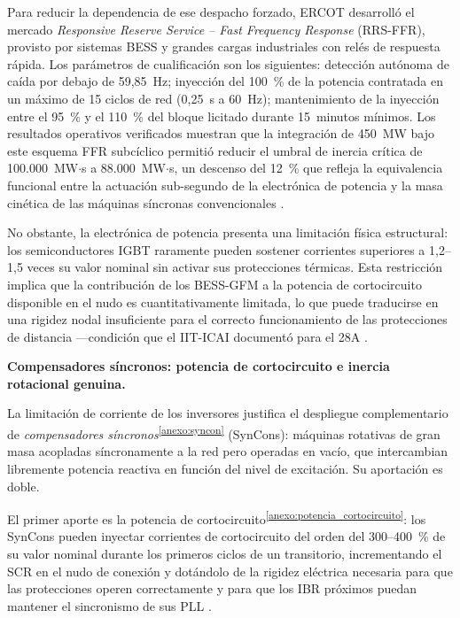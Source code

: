 Para reducir la dependencia de ese despacho forzado, ERCOT desarrolló
el mercado \textit{Responsive Reserve Service -- Fast Frequency Response}
(RRS-FFR), provisto por sistemas BESS y grandes cargas industriales con
relés de respuesta rápida. Los parámetros de cualificación son los
siguientes: detección autónoma de caída por debajo de 59{,}85~Hz;
inyección del 100~\% de la potencia contratada en un máximo de 15 ciclos
de red (0{,}25~s a 60~Hz); mantenimiento de la inyección entre el 95~\%
y el 110~\% del bloque licitado durante 15~minutos mínimos. Los
resultados operativos verificados muestran que la integración de
450~MW bajo este esquema FFR subcíclico permitió reducir el umbral de
inercia crítica de 100.000~MW$\cdot$s a 88.000~MW$\cdot$s, un descenso
del 12~\% que refleja la equivalencia funcional entre la actuación
sub-segundo de la electrónica de potencia y la masa cinética de las
máquinas síncronas convencionales \cite{futured2024,nrel2025}.

No obstante, la electrónica de potencia presenta una limitación física
estructural: los semiconductores IGBT raramente pueden sostener
corrientes superiores a 1{,}2--1{,}5 veces su valor nominal sin activar
sus protecciones térmicas. Esta restricción implica que la contribución
de los BESS-GFM a la potencia de cortocircuito disponible en el nudo es
cuantitativamente limitada, lo que puede traducirse en una rigidez nodal
insuficiente para el correcto funcionamiento de las protecciones de
distancia ---condición que el IIT-ICAI documentó para el 28A
\cite{icai2025}.

\vspace{0.4cm}
\noindent\textbf{Compensadores síncronos: potencia de cortocircuito e
inercia rotacional genuina.}

La limitación de corriente de los inversores justifica el despliegue
complementario de \textit{compensadores
síncronos}\textsuperscript{\ref{anexo:syncon}} (SynCons): máquinas
rotativas de gran masa acopladas síncronamente a la red pero operadas en
vacío, que intercambian libremente potencia reactiva en función del
nivel de excitación. Su aportación es doble.

El primer aporte es la potencia de
cortocircuito\textsuperscript{\ref{anexo:potencia_cortocircuito}}: los
SynCons pueden inyectar corrientes de cortocircuito del orden del
300--400~\% de su valor nominal durante los primeros ciclos de un
transitorio, incrementando el SCR en el nudo de conexión y dotándolo de
la rigidez eléctrica necesaria para que las protecciones operen
correctamente y para que los IBR próximos puedan mantener el sincronismo
de sus PLL \cite{nrel2025,futured2024}.

